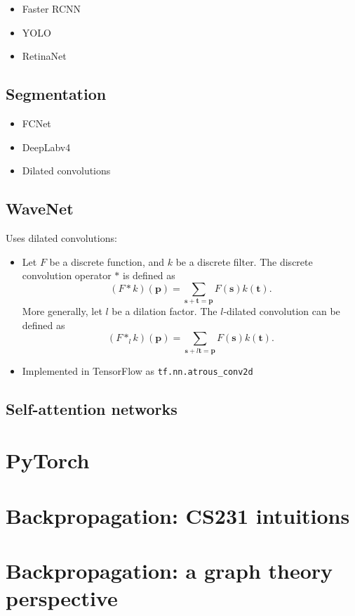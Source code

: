 \begin{itemize}
  \item Faster RCNN
  \item YOLO
  \item RetinaNet
\end{itemize}

\subsection{Segmentation}

\begin{itemize}
  \item FCNet
  \item DeepLabv4
  \item Dilated convolutions
\end{itemize}

\subsection{WaveNet}
Uses dilated convolutions:
  \begin{itemize}
      \item Let $F$ be a discrete function, and $k$ be a discrete filter.  The discrete convolution operator $*$ is defined as
        \[
          (F * k)(\mathbf{p}) = \sum_{\mathbf{s+t=p}} F(\mathbf{s}) k(\mathbf{t}).
        \]
        More generally, let $l$ be a dilation factor.  The $l$-dilated convolution can be defined as
        \[
          (F *_l k)(\mathbf{p}) = \sum_{\mathbf{s}+l\mathbf{t=p}} F(\mathbf{s}) k(\mathbf{t}).
        \]
      \item Implemented in TensorFlow as \texttt{tf.nn.atrous\_conv2d}
    \end{itemize}

\subsection{Self-attention networks}

\section{PyTorch}



\section{Backpropagation: CS231 intuitions}


\section{Backpropagation: a graph theory perspective}

